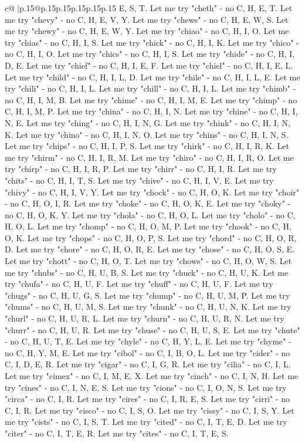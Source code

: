 \documentclass{article}
\begin{document}
{\begin{supertabular}{c@{$\;$}|p{.15\linewidth}@{}p{.15\linewidth}p{.15\linewidth}p{.15\linewidth}p{.15\linewidth}p{.15\linewidth}}
{{{E, S, T. Let me try "cheth" {-} no C, H, E, T. Let me try "chevy" {-} no C, H, E, V, Y. Let me try "chews" {-} no C, H, E, W, S. Let me try "chewy" {-} no C, H, E, W, Y. Let me try "chiao" {-} no C, H, I, O. Let me try "chias" {-} no C, H, I, S. Let me try "chick" {-} no C, H, I, K. Let me try "chico" {-} no C, H, I, O. Let me try "chics" {-} no C, H, I, S. Let me try "chide" {-} no C, H, I, D, E. Let me try "chief" {-} no C, H, I, E, F. Let me try "chiel" {-} no C, H, I, E, L. Let me try "child" {-} no C, H, I, L, D. Let me try "chile" {-} no C, H, I, L, E. Let me try "chili" {-} no C, H, I, L. Let me try "chill" {-} no C, H, I, L. Let me try "chimb" {-} no C, H, I, M, B. Let me try "chime" {-} no C, H, I, M, E. Let me try "chimp" {-} no C, H, I, M, P. Let me try "china" {-} no C, H, I, N. Let me try "chine" {-} no C, H, I, N, E. Let me try "ching" {-} no C, H, I, N, G. Let me try "chink" {-} no C, H, I, N, K. Let me try "chino" {-} no C, H, I, N, O. Let me try "chins" {-} no C, H, I, N, S. Let me try "chips" {-} no C, H, I, P, S. Let me try "chirk" {-} no C, H, I, R, K. Let me try "chirm" {-} no C, H, I, R, M. Let me try "chiro" {-} no C, H, I, R, O. Let me try "chirp" {-} no C, H, I, R, P. Let me try "chirr" {-} no C, H, I, R. Let me try "chits" {-} no C, H, I, T, S. Let me try "chive" {-} no C, H, I, V, E. Let me try "chivy" {-} no C, H, I, V, Y. Let me try "chock" {-} no C, H, O, K. Let me try "choir" {-} no C, H, O, I, R. Let me try "choke" {-} no C, H, O, K, E. Let me try "choky" {-} no C, H, O, K, Y. Let me try "chola" {-} no C, H, O, L. Let me try "cholo" {-} no C, H, O, L. Let me try "chomp" {-} no C, H, O, M, P. Let me try "chook" {-} no C, H, O, K. Let me try "chops" {-} no C, H, O, P, S. Let me try "chord" {-} no C, H, O, R, D. Let me try "chore" {-} no C, H, O, R, E. Let me try "chose" {-} no C, H, O, S, E. Let me try "chott" {-} no C, H, O, T. Let me try "chows" {-} no C, H, O, W, S. Let me try "chubs" {-} no C, H, U, B, S. Let me try "chuck" {-} no C, H, U, K. Let me try "chufa" {-} no C, H, U, F. Let me try "chuff" {-} no C, H, U, F. Let me try "chugs" {-} no C, H, U, G, S. Let me try "chump" {-} no C, H, U, M, P. Let me try "chums" {-} no C, H, U, M, S. Let me try "chunk" {-} no C, H, U, N, K. Let me try "churl" {-} no C, H, U, R, L. Let me try "churn" {-} no C, H, U, R, N. Let me try "churr" {-} no C, H, U, R. Let me try "chuse" {-} no C, H, U, S, E. Let me try "chute" {-} no C, H, U, T, E. Let me try "chyle" {-} no C, H, Y, L, E. Let me try "chyme" {-} no C, H, Y, M, E. Let me try "cibol" {-} no C, I, B, O, L. Let me try "cider" {-} no C, I, D, E, R. Let me try "cigar" {-} no C, I, G, R. Let me try "cilia" {-} no C, I, L. Let me try "cimex" {-} no C, I, M, E, X. Let me try "cinch" {-} no C, I, N, H. Let me try "cines" {-} no C, I, N, E, S. Let me try "cions" {-} no C, I, O, N, S. Let me try "circa" {-} no C, I, R. Let me try "cires" {-} no C, I, R, E, S. Let me try "cirri" {-} no C, I, R. Let me try "cisco" {-} no C, I, S, O. Let me try "cissy" {-} no C, I, S, Y. Let me try "cists" {-} no C, I, S, T. Let me try "cited" {-} no C, I, T, E, D. Let me try "citer" {-} no C, I, T, E, R. Let me try "cites" {-} no C, I, T, E, S. }}}
\end{supertabular}}
\end{document}
